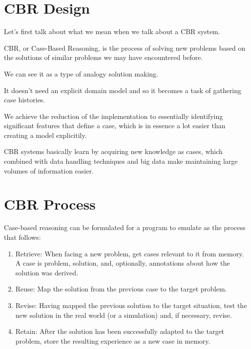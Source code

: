 \section{CBR Design}
\label{cap5:sec:introduccion}

Let's first talk about what we mean when we talk about a CBR system.

CBR, or Case-Based Reasoning, is the process of solving new problems based on the solutions of similar problems we may have encountered before.

We can see it as a type of analogy solution making.

It doesn't need an explicit domain model and so it becomes a task of gathering case histories. 

We achieve the reduction of the implementation to essentially identifying significant features that define a case, which is in essence a lot easier than creating a model explicitily. 

CBR systems basically learn by acquiring new knowledge as cases, which combined with data handling techniques and big data make maintaining large volumes of information easier.

\section{CBR Process}
\label{cap5:sec:process}

Case-based reasoning can be formulated for a program to emulate as the process that follows:

\begin{enumerate}
\item Retrieve: When facing a new problem, get cases relevant to it from memory. A case is problem, solution, and, optionally, annotations about how the solution was derived. 
\item Reuse: Map the solution from the previous case to the target problem. 
\item Revise: Having mapped the previous solution to the target situation, test the new solution in the real world (or a simulation) and, if necessary, revise. 
\item Retain: After the solution has been successfully adapted to the target problem, store the resulting experience as a new case in memory. 
\end{enumerate}

